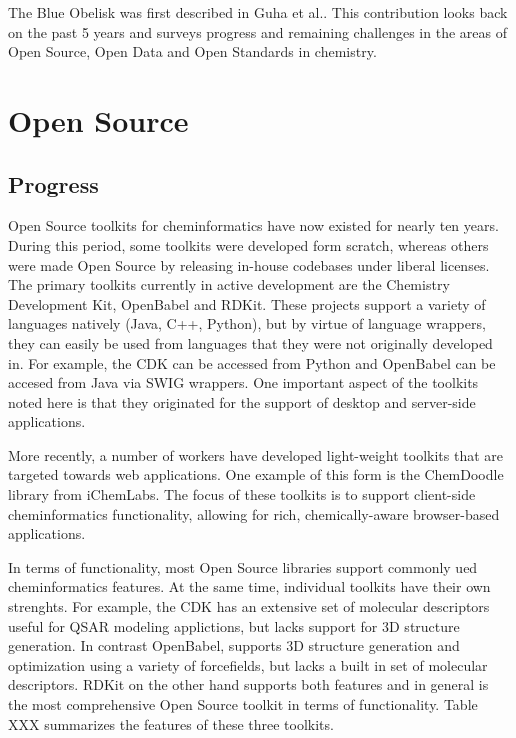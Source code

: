 \documentclass[10pt]{bmc_article}
\newenvironment{bmcformat}{\begin{raggedright}\baselineskip20pt\sloppy\setboolean{publ}{false}}{\end{raggedright}\baselineskip20pt\sloppy}
\begin{document}
\begin{bmcformat}
The Blue Obelisk was first described in Guha et al.\cite{guha2006}. This
contribution looks back on the past 5 years and surveys progress and
remaining challenges in the areas of Open Source, Open Data and Open
Standards in chemistry.

\section*{Open Source}
  \subsection*{Progress}

Open Source toolkits for cheminformatics have now existed for nearly
ten years. During this period, some toolkits were developed form
scratch, whereas others were made Open Source by releasing in-house
codebases under liberal licenses. The primary toolkits currently in
active development are the Chemistry Development Kit, OpenBabel and
RDKit. These projects support a variety of languages natively (Java,
C++, Python), but by virtue of language wrappers, they can easily be
used from languages that they were not originally developed in. For
example, the CDK can be accessed from Python and OpenBabel can be
accesed from Java via SWIG wrappers. One important aspect of the
toolkits noted here is that they originated for the support of desktop
and server-side applications. 

More recently, a number of workers have developed light-weight
toolkits that are targeted towards web applications. One example of
this form is the ChemDoodle library from iChemLabs. The focus of these
toolkits is to support client-side cheminformatics functionality,
allowing for rich, chemically-aware browser-based applications.

In terms of functionality, most Open Source libraries support commonly
ued cheminformatics features. At the same time, individual toolkits
have their own strenghts. For example, the CDK has an extensive set of
molecular descriptors useful for QSAR modeling applictions, but lacks
support for 3D structure generation. In contrast OpenBabel, supports
3D structure generation and optimization using a variety of
forcefields, but lacks a built in set of molecular descriptors. RDKit
on the other hand supports both features and in general is the most
comprehensive Open Source toolkit in terms of functionality. Table XXX
summarizes the features of these three toolkits.


\end{bmcformat}
\end{document}
